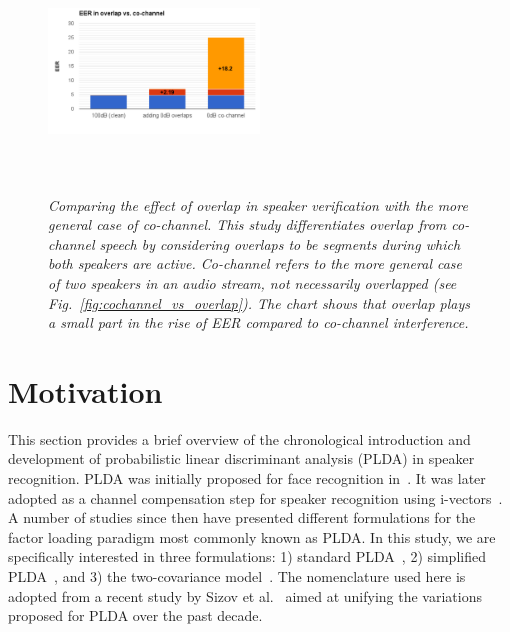 \documentclass[journal]{IEEEtran}
\begin{document}
\begin{figure}[h!]
	\vspace{-1mm}
	\includegraphics[height = 2.5in, width=0.5\textwidth]{figures/overlap_vs_cochannel_sid-crop}
	\vspace{-8mm}
	\caption{\it \small Comparing the effect of overlap in speaker verification with the more general case of co-channel. This study differentiates overlap from co-channel speech by considering overlaps to be segments during which both speakers are active. Co-channel refers to the more general case of two speakers in an audio stream, not necessarily overlapped (see Fig.~\ref{fig:cochannel_vs_overlap}). The chart shows that overlap plays a small part in the rise of EER compared to co-channel interference.}
	\label{fig:ovl_in_sid}
	\vspace{-1mm}
\end{figure}


\section{Motivation}
\label{sec:background}
This section provides a brief overview of the chronological introduction and development of probabilistic linear discriminant analysis (PLDA) in speaker recognition. 
PLDA was initially proposed for face recognition in~\cite{prince_plda}. 
It was later adopted as a channel compensation step for speaker recognition using i-vectors~\cite{kenny_first_plda}. 
A number of studies since then have presented different formulations for the factor loading paradigm most commonly known as PLDA. 
In this study, we are specifically interested in three formulations: 1) standard PLDA~\cite{kenny_plda}, 2) simplified PLDA~\cite{kenny_heavytailplda,garcia_plda}, and 3) the two-covariance model~\cite{brummer_plda}. 
The nomenclature used here is adopted from a recent study by Sizov et al.~\cite{sizov2014unifying} aimed at unifying the variations proposed for PLDA over the past decade. 
\end{document}
